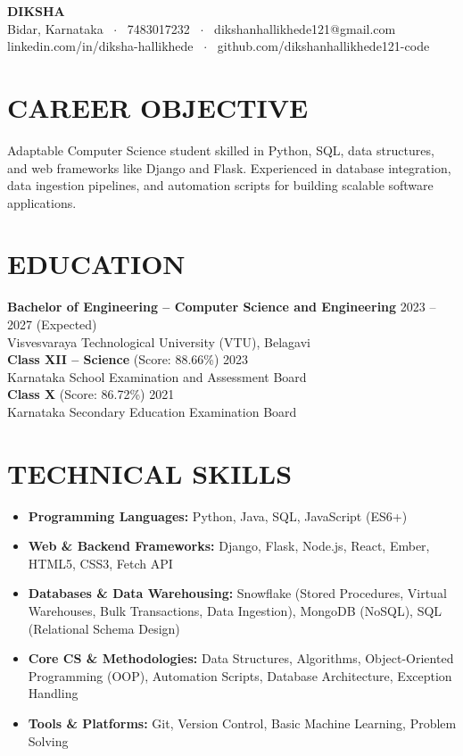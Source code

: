 \documentclass{article}
\begin{document}
\begin{center}
    {\Huge \textbf{DIKSHA}} \\[6pt]
    Bidar, Karnataka \ $\cdot$ \ 7483017232 \ $\cdot$ \ dikshanhallikhede121@gmail.com \\
    linkedin.com/in/diksha-hallikhede \ $\cdot$ \ github.com/dikshanhallikhede121-code
\end{center}

\vspace{-5pt}

\section*{CAREER OBJECTIVE}
Adaptable Computer Science student skilled in Python, SQL, data structures, and web frameworks like Django and Flask. Experienced in database integration, data ingestion pipelines, and automation scripts for building scalable software applications.

\section*{EDUCATION}
\textbf{Bachelor of Engineering -- Computer Science and Engineering} \hfill 2023 -- 2027 (Expected) \\
Visvesvaraya Technological University (VTU), Belagavi \\[4pt]
\textbf{Class XII -- Science} (Score: 88.66\%) \hfill 2023 \\
Karnataka School Examination and Assessment Board \\[4pt]
\textbf{Class X} (Score: 86.72\%) \hfill 2021 \\
Karnataka Secondary Education Examination Board

\section*{TECHNICAL SKILLS}
\begin{itemize}[leftmargin=1.5em, itemsep=2pt]
    \item \textbf{Programming Languages:} Python, Java, SQL, JavaScript (ES6+)
    \item \textbf{Web \& Backend Frameworks:} Django, Flask, Node.js, React, Ember, HTML5, CSS3, Fetch API
    \item \textbf{Databases \& Data Warehousing:} Snowflake (Stored Procedures, Virtual Warehouses, Bulk Transactions, Data Ingestion), MongoDB (NoSQL), SQL (Relational Schema Design)
    \item \textbf{Core CS \& Methodologies:} Data Structures, Algorithms, Object-Oriented Programming (OOP), Automation Scripts, Database Architecture, Exception Handling
    \item \textbf{Tools \& Platforms:} Git, Version Control, Basic Machine Learning, Problem Solving
\end{itemize}
\end{document}
